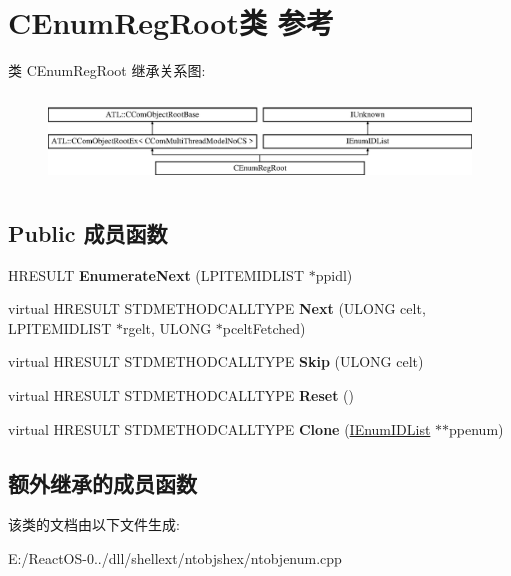 \hypertarget{class_c_enum_reg_root}{}\section{C\+Enum\+Reg\+Root类 参考}
\label{class_c_enum_reg_root}
类 C\+Enum\+Reg\+Root 继承关系图\+:\begin{figure}[H]
\begin{center}
\leavevmode
\includegraphics[height=2.386364cm]{class_c_enum_reg_root}
\end{center}
\end{figure}
\subsection*{Public 成员函数}
\begin{DoxyCompactItemize}
\item 
\mbox{\label{class_c_enum_reg_root_acea01928b9a78c808c4ee82801022ff3}} 
H\+R\+E\+S\+U\+LT {\bfseries Enumerate\+Next} (L\+P\+I\+T\+E\+M\+I\+D\+L\+I\+ST $\ast$ppidl)
\item 
\mbox{\label{class_c_enum_reg_root_a4ac126ff594fbed755baf535a4f496d6}} 
virtual H\+R\+E\+S\+U\+LT S\+T\+D\+M\+E\+T\+H\+O\+D\+C\+A\+L\+L\+T\+Y\+PE {\bfseries Next} (U\+L\+O\+NG celt, L\+P\+I\+T\+E\+M\+I\+D\+L\+I\+ST $\ast$rgelt, U\+L\+O\+NG $\ast$pcelt\+Fetched)
\item 
\mbox{\label{class_c_enum_reg_root_a883431ecbac941ebb7bac5de147ed797}} 
virtual H\+R\+E\+S\+U\+LT S\+T\+D\+M\+E\+T\+H\+O\+D\+C\+A\+L\+L\+T\+Y\+PE {\bfseries Skip} (U\+L\+O\+NG celt)
\item 
\mbox{\label{class_c_enum_reg_root_a67fd6795cb9f4be023329ec190d29f14}} 
virtual H\+R\+E\+S\+U\+LT S\+T\+D\+M\+E\+T\+H\+O\+D\+C\+A\+L\+L\+T\+Y\+PE {\bfseries Reset} ()
\item 
\mbox{\label{class_c_enum_reg_root_aed571d4184928f05a95bcbbc7ecfe10f}} 
virtual H\+R\+E\+S\+U\+LT S\+T\+D\+M\+E\+T\+H\+O\+D\+C\+A\+L\+L\+T\+Y\+PE {\bfseries Clone} (\hyperlink{interface_i_enum_i_d_list}{I\+Enum\+I\+D\+List} $\ast$$\ast$ppenum)
\end{DoxyCompactItemize}
\subsection*{额外继承的成员函数}


该类的文档由以下文件生成\+:\begin{DoxyCompactItemize}
\item 
E\+:/\+React\+O\+S-\/0../dll/shellext/ntobjshex/ntobjenum.\+cpp\end{DoxyCompactItemize}
